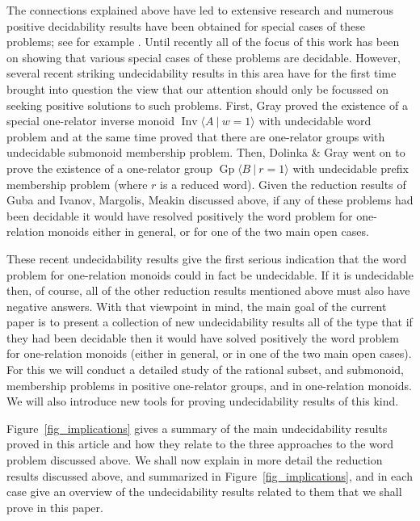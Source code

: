 \documentclass{amsart}
\newcommand{\Gpres}[2]{\operatorname{Gp}\bigl\langle #1\:|\:#2 \bigr\rangle}
\newcommand{\Ipres}[2]{\operatorname{Inv}\bigl\langle #1\:|\:#2 \bigr\rangle}
\theoremstyle{plain}
\theoremstyle{definition}
\begin{document}
The connections explained above have led to extensive research and numerous positive decidability results have been obtained for special cases of these problems; see for example  
\cite{Guba1997, Ivanov2001, Jackson2001, Jackson2002, Arye2012, MMSunik2005, Meakin2007}.  
Until recently all of the focus of this work has been on showing that various special cases of these problems are decidable. 
However, several recent striking undecidability results 
in this area have for the first time brought into question the view that our attention should only be focussed on seeking positive solutions to such problems. 
First, Gray \cite{gray2020undecidability} proved the existence of a special one-relator inverse monoid $\Ipres{A}{w=1}$ with undecidable word problem and at the same time proved that there are one-relator groups with undecidable submonoid membership problem.  Then, Dolinka \& Gray \cite{dolinka2021new} went on to prove the existence of a one-relator group $\Gpres{B}{r=1}$ with undecidable prefix membership problem (where $r$ is a reduced word). Given the reduction results of Guba \cite{Guba1997} and Ivanov, Margolis, Meakin \cite{Ivanov2001} discussed above, if any of these problems had been decidable it would have resolved positively the word problem for one-relation monoids either in general, or for one of the two main open cases.  

These recent undecidability results give the first serious indication that the word problem for one-relation monoids could in fact be undecidable.  
If it is undecidable then, of course, all of the other reduction results mentioned above must also have negative answers. With that viewpoint in mind, the main goal of the current paper is to present a collection of new undecidability results all of the type that if they had been decidable then it would have solved positively the word problem for one-relation monoids (either in general, or in one of the two main open cases).  
For this we will conduct a detailed study of the rational subset, and submonoid, membership problems in positive one-relator groups, and in one-relation monoids. 
We will also introduce new tools for proving undecidability results of this kind.  





Figure~\ref{fig_implications} gives a summary of the main undecidability results proved in this article and how they relate to the three approaches to the word problem discussed above. 
We shall now explain in more detail the reduction results discussed above, and summarized in Figure~\ref{fig_implications}, and in each case give an overview of the undecidability results related to them that we shall prove in this paper. 
\end{document}

